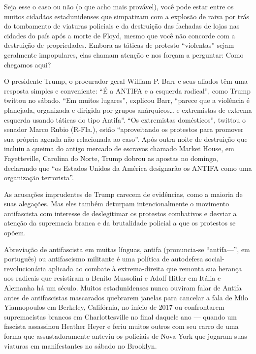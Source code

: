 Seja esse o caso ou não (o que acho mais provável), você pode estar entre os muitos cidadãos estadunidenses que simpatizam com a explosão de raiva por trás do tombamento de viaturas policiais e da destruição das fachadas de lojas nas cidades do país após a morte de Floyd, mesmo que você não concorde com a destruição de propriedades. Embora as táticas de protesto “violentas” sejam geralmente impopulares, elas chamam atenção e nos forçam a perguntar: Como chegamos aqui?

O presidente Trump, o procurador-geral William P. Barr e seus aliados têm uma resposta simples e conveniente: “É a ANTIFA e a esquerda radical”, como Trump twittou no sábado. “Em muitos lugares”, explicou Barr, “parece que a violência é planejada, organizada e dirigida por grupos anárquicos… e extremistas de extrema esquerda usando táticas do tipo Antifa”. “Os extremistas domésticos”, twittou o senador Marco Rubio (R-Fla.), estão “aproveitando os protestos para promover sua própria agenda não relacionada ao caso”. Após outra noite de destruição que incluiu a queima do antigo mercado de escravos chamado Market House, em Fayetteville, Carolina do Norte, Trump dobrou as apostas no domingo, declarando que “os Estados Unidos da América designarão os ANTIFA como uma organização terrorista”.
 
As acusações imprudentes de Trump carecem de evidências, como a maioria de suas alegações. Mas eles também deturpam intencionalmente o movimento antifascista com interesse de deslegitimar os protestos combativos e desviar a atenção da supremacia branca e da brutalidade policial a que os protestos se opõem.
 
Abreviação de antifascista em muitas línguas, antifa (pronuncia-se “antífa—”, em português) ou antifascismo militante é uma política de autodefesa social-revolucionária aplicada ao combate à extrema-direita que remonta sua herança aos radicais que resistiram a Benito Mussolini e Adolf Hitler em Itália e Alemanha há um século. Muitos estadunidenses nunca ouviram falar de Antifa antes de antifascistas mascarados quebrarem janelas para cancelar a fala de Milo Yiannopoulos em Berkeley, Califórnia, no início de 2017 ou confrontarem supremacistas brancos em Charlottesville no final daquele ano — quando um fascista assassinou Heather Heyer e feriu muitos outros com seu carro de uma forma que assustadoramente anteviu os policiais de Nova York que jogaram suas viaturas em manifestantes no sábado no Brooklyn.

